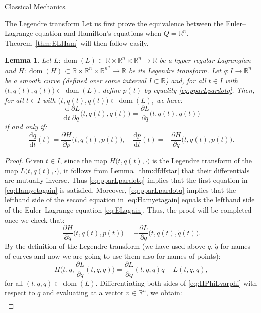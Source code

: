 \documentclass[oneside,a4paper,11pt]{amsbook}
\newcommand{\R}{\mathds R}
\newcommand{\dd}{\mathrm d}
\DeclareMathOperator{\Dom}{dom}
\theoremstyle{remark}\newtheorem{exercise}{Exercise}[chapter]
\theoremstyle{plain}\newtheorem{teo}{Theorem}[section]
\theoremstyle{plain}\newtheorem{lem}[teo]{Lemma}
\theoremstyle{plain}\newtheorem{prop}[teo]{Proposition}
\theoremstyle{plain}\newtheorem{cor}[teo]{Corollary}
\theoremstyle{definition}\newtheorem{defin}[teo]{Definition}
\theoremstyle{remark}\newtheorem{rem}[teo]{Remark}
\theoremstyle{definition}\newtheorem{notation}[teo]{Notation}
\theoremstyle{definition}\newtheorem{convention}[teo]{Convention}
\theoremstyle{definition}\newtheorem{example}[teo]{Example}
\numberwithin{section}{chapter}
\numberwithin{equation}{section}
\begin{document}
\begin{chapter}{Classical Mechanics}
\begin{section}{The Legendre transform}
Let us first prove the equivalence between the Euler--Lagrange equation and Hamilton's equations when $Q=\R^n$.
Theorem~\ref{thm:ELHam} will then follow easily.
\begin{lem}\label{thm:ELHamlemma}
Let $L:\Dom(L)\subset\R\times\R^n\times\R^n\to\R$ be a hyper-regular Lagrangian
and $H:\Dom(H)\subset\R\times\R^n\times{\R^n}^*\to\R$ be its Legendre transform. Let $q:I\to\R^n$ be
a smooth curve (defined over some interval $I\subset\R$) and, for all $t\in I$ with $\big(t,q(t),\dot q(t)\big)\in\Dom(L)$,
define $p(t)$ by equality \eqref{eq:pparLpardotq}. Then, for all $t\in I$ with $\big(t,q(t),\dot q(t)\big)\in\Dom(L)$,
we have:
\begin{equation}\label{eq:ELagain}
\frac{\dd}{\dd t}\frac{\partial L}{\partial\dot q}\big(t,q(t),\dot q(t)\big)=\frac{\partial L}{\partial q}\big(t,q(t),\dot q(t)\big)
\end{equation}
if and only if:
\begin{equation}\label{eq:Hamyetagain}
\frac{\dd q}{\dd t}(t)=\frac{\partial H}{\partial p}\big(t,q(t),p(t)\big),\quad
\frac{\dd p}{\dd t}(t)=-\frac{\partial H}{\partial q}\big(t,q(t),p(t)\big).
\end{equation}
\end{lem}
\begin{proof}
Given $t\in I$, since the map $H\big(t,q(t),\cdot\big)$ is the Legendre transform of the map $L\big(t,q(t),\cdot\big)$,
it follows from Lemma~\ref{thm:dfdfstar} that their differentials are mutually inverse. Thus
\eqref{eq:pparLpardotq} implies that the first equation in \eqref{eq:Hamyetagain} is satisfied. Moreover,
\eqref{eq:pparLpardotq} implies that the lefthand side of the second equation in \eqref{eq:Hamyetagain} equals the
lefthand side of the Euler--Lagrange equation \eqref{eq:ELagain}. Thus, the proof will be
completed once we check that:
\[\frac{\partial H}{\partial q}\big(t,q(t),p(t)\big)=-\frac{\partial L}{\partial q}\big(t,q(t),\dot q(t)\big).\]
By the definition of the Legendre transform (we have used above $q$, $\dot q$ for names of curves and now
we are going to use them also for names of points):
\begin{equation}\label{eq:HPhiLvarphi}
H\Big(t,q,\frac{\partial L}{\partial\dot q}(t,q,\dot q)\Big)=
\frac{\partial L}{\partial\dot q}(t,q,\dot q)\dot q-L(t,q,\dot q),
\end{equation}
for all $(t,q,\dot q)\in\Dom(L)$. Differentiating both sides of \eqref{eq:HPhiLvarphi} with respect to $q$ and
evaluating at a vector $v\in\R^n$, we obtain:
\begin{multline*}

\end{multline*}
\end{proof}
\end{section}
\end{chapter}
\end{document}
